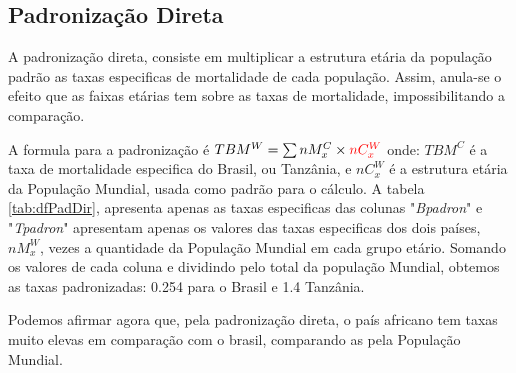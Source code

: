 \subsection{Padronização Direta}
A padronização direta, consiste em  multiplicar a estrutura etária da população padrão as taxas especificas de mortalidade de cada população. Assim, anula-se o efeito que as faixas etárias tem sobre as taxas de mortalidade, impossibilitando a comparação.

A formula para a padronização é $ TBM^W = \sum nM^C_x \times \textcolor{red}{nC^W_x}  $ onde: $TBM^C$ é a taxa de mortalidade especifica do Brasil, ou Tanzânia, e $ nC^W_x $ é a estrutura etária da População Mundial, usada como padrão para o cálculo. A tabela \ref{tab:dfPadDir}, apresenta apenas as taxas especificas das colunas  "\emph{Bpadron}"  e  "\emph{Tpadron}" apresentam apenas os valores das taxas especificas dos dois países, $nM^W_x$, vezes a quantidade da População Mundial em cada grupo etário. Somando os valores de cada coluna e dividindo pelo total da população Mundial, obtemos as taxas padronizadas: 0.254 para o Brasil e 1.4 Tanzânia.

Podemos afirmar agora que, pela padronização direta, o país africano tem taxas muito elevas em comparação com o brasil, comparando as pela População Mundial.

